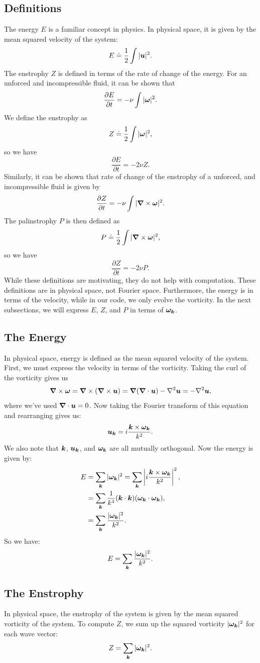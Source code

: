 \documentclass[12pt]{article}
\def\v{\bm}
\def\vw{{\v\w}}
\begin{document}
\subsection{Definitions}
The energy $E$ is a familiar concept in physics. In physical space, it is given by the mean squared velocity of the system:
$$
E\doteq \frac{1}{2} \int |\vu|^2.
$$
The enstrophy $Z$ is defined in terms of the rate of change of the energy. For an unforced and incompressible fluid, it can be shown \cite{frisch95} that
$$
\frac{\partial E}{\partial t} = -\nu \int |\vw|^2.
$$
We define the enstrophy as
$$
Z\doteq\frac{1}{2}\int |\vw|^2,
$$
so we have 
$$
\frac{\partial E}{\partial t} = -2\nu Z.
$$
Similarly, it can be shown \cite{frisch95} that rate of change of the enstrophy of a unforced, and incompressible fluid is given by
$$
\frac{\partial Z}{\partial t} = -\nu \int |\grad\times \vw|^2.
$$
The palinstrophy $P$ is then defined as
$$
P\doteq\frac{1}{2}\int |\grad \times \vw|^2,
$$
so we have 
$$
\frac{\partial Z}{\partial t} = -2\nu P.
$$
While these definitions are motivating, they do not help with computation. These definitions are in physical space, not Fourier space. Furthermore, the energy is in terms of the velocity, while in our code, we only evolve the vorticity. In the next subsections, we will express $E$, $Z$, and $P$ in terms of $\vw_\vk$. 
\subsection{The Energy}
In physical space, energy is defined as the mean squared velocity of the system. First, we must express the velocity in terms of the vorticity. Taking the curl of the vorticity gives us
$$\grad \times \vw = \grad \times(\grad \times \vu) = \grad(\grad\cdot \vu)- {\nabla}^2 \vu = - {\nabla}^2 \vu,$$
where we've used $\grad\cdot \vu = 0$. Now taking the Fourier transform of this equation and rearranging gives us:
$$\vu_\vk = i \frac{\vk\times \vw_\vk}{k^2}. $$
We also note that $\vk$, $\vu_\vk$, and $\vw_\vk$ are all mutually orthogonal. Now the energy is given by:
\begin{align*}
E &= \sum_{\vk} |\vw_\vk|^2 = \sum_{\vk} \left|i \frac{\vk\times \vw_\vk}{k^2} \right|^2,\\
& =\sum_{\vk}\frac{1}{k^4}(\vk\cdot \vk ) (\vw_\vk\cdot \vw_\vk)  , \\
& = \sum_{\vk}\frac{|\vw_\vk|^2}{k^2}.
\end{align*}
So we have:
$$E = \sum_{\vk}\frac{|\vw_\vk|^2}{k^2}.$$
\subsection{The Enstrophy}
In physical space, the enstrophy of the system is given by the mean squared vorticity of the system. To compute $Z$, we sum up the squared vorticity $|\vw_\vk|^2$ for each wave vector:
$$ Z = \sum_{\vk} |\vw_\vk|^2.$$
\end{document}
